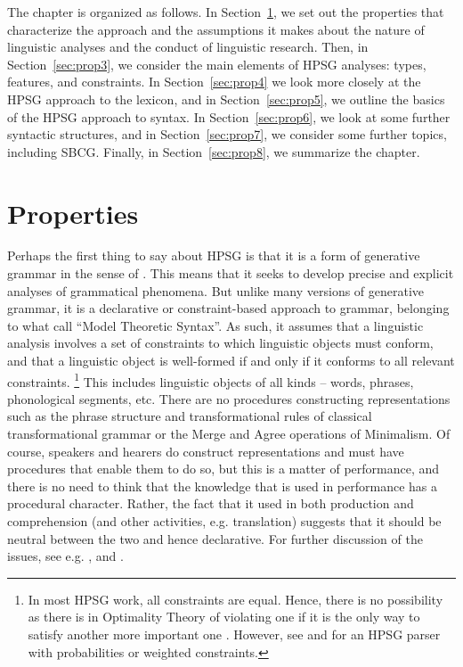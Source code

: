 \documentclass[output=paper
	        ,collection
	        ,collectionchapter
 	        ,biblatex
                ,babelshorthands
                ,newtxmath
                ,draftmode
                ,colorlinks, citecolor=brown
]{langscibook}
\begin{document}
The chapter is organized as follows. In Section~\ref{sec:prop2}, we set out the properties that characterize the approach and the assumptions it makes about the nature of linguistic analyses and the conduct of linguistic research. Then, in Section~\ref{sec:prop3}, we consider the main elements of HPSG analyses: types, features, and constraints. In Section~\ref{sec:prop4} we look more closely at the HPSG approach to the lexicon, and in Section~\ref{sec:prop5}, we outline the basics of the HPSG approach to syntax. In Section~\ref{sec:prop6}, we look at some further syntactic structures, and in Section~\ref{sec:prop7}, we consider some further topics, including SBCG. Finally, in Section~\ref{sec:prop8}, we summarize the chapter.


\section{Properties}\label{sec:prop2}
\label{prop:sec-properties}

Perhaps the first thing to say about HPSG is that it is a form of generative grammar in the sense of \citet{Chomsky57a}. This means that it seeks to develop precise and explicit analyses of grammatical phenomena. But unlike many versions of generative grammar, it is a declarative or constraint-based approach to grammar, belonging to what \citet{PS2001a} call ``Model Theoretic Syntax''. As such, it assumes that a linguistic analysis involves a set of constraints to which linguistic objects must conform, and that a linguistic object is well-formed if and only if it conforms to all relevant constraints.%
%
\footnote{In most HPSG work, all constraints are equal. Hence, there is no possibility as there is in Optimality Theory of violating one if it is the only way to satisfy another more important one \citep{Malouf2003a}. However, see  and  for an HPSG parser with probabilities or weighted constraints.}
%
This includes linguistic objects of all kinds – words, phrases, phonological segments, etc. There are no procedures constructing representations such as the phrase structure and transformational rules of classical transformational grammar or the Merge and Agree operations of Minimalism. Of course, speakers and hearers do construct representations and must have procedures that enable them to do so, but this is a matter of performance, and there is no need to think that the knowledge that is used in performance has a procedural character. Rather, the fact that it used in both production and comprehension (and other activities, e.g. translation) suggests that it should be neutral between the two and hence declarative. For further discussion of the issues, see e.g. \citet{PS2001a}, \citet{Postal2003a} and \citet{SW2011a,SW2015a}.
\end{document}
